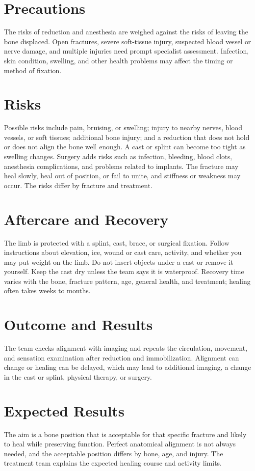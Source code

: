 \section*{Precautions}
The risks of reduction and anesthesia are weighed against the risks of leaving the bone displaced. Open fractures, severe soft-tissue injury, suspected blood vessel or nerve damage, and multiple injuries need prompt specialist assessment. Infection, skin condition, swelling, and other health problems may affect the timing or method of fixation.

\section*{Risks}
Possible risks include pain, bruising, or swelling; injury to nearby nerves, blood vessels, or soft tissues; additional bone injury; and a reduction that does not hold or does not align the bone well enough. A cast or splint can become too tight as swelling changes. Surgery adds risks such as infection, bleeding, blood clots, anesthesia complications, and problems related to implants. The fracture may heal slowly, heal out of position, or fail to unite, and stiffness or weakness may occur. The risks differ by fracture and treatment.

\section*{Aftercare and Recovery}
The limb is protected with a splint, cast, brace, or surgical fixation. Follow instructions about elevation, ice, wound or cast care, activity, and whether you may put weight on the limb. Do not insert objects under a cast or remove it yourself. Keep the cast dry unless the team says it is waterproof. Recovery time varies with the bone, fracture pattern, age, general health, and treatment; healing often takes weeks to months.

\section*{Outcome and Results}
The team checks alignment with imaging and repeats the circulation, movement, and sensation examination after reduction and immobilization. Alignment can change or healing can be delayed, which may lead to additional imaging, a change in the cast or splint, physical therapy, or surgery.

\section*{Expected Results}
The aim is a bone position that is acceptable for that specific fracture and likely to heal while preserving function. Perfect anatomical alignment is not always needed, and the acceptable position differs by bone, age, and injury. The treatment team explains the expected healing course and activity limits.

